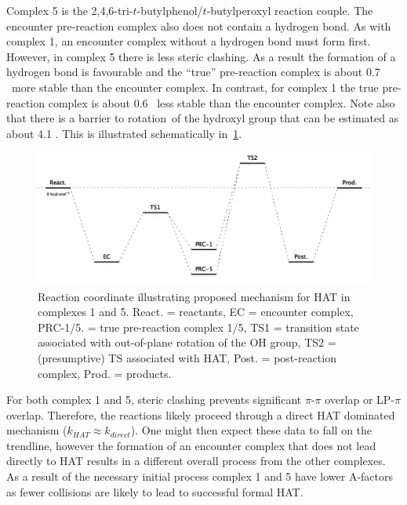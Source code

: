 \begin{doublespace}
Complex 5 is the 2,4,6-tri-$t$-butylphenol/$t$-butylperoxyl reaction couple. The
encounter pre-reaction complex also does not contain a hydrogen bond. As with
complex 1, an encounter complex without a hydrogen bond must form
first. However, in complex 5 there is less steric clashing. As a result the
formation of a hydrogen bond is favourable and the ``true'' pre-reaction complex
is about 0.7 \kcalmol\ more stable than the encounter complex. In contrast, for
complex 1 the true pre-reaction complex is about 0.6 \kcalmol\ less stable than
the encounter complex. Note also that there is a barrier to
rotation\footnotemark\ of the hydroxyl group that can be estimated as about 4.1
\kcalmol. This is illustrated schematically in~\ref{fig:encounter-pes}.


\begin{figure}[!htbp]
  \centering
  \includegraphics[width=\textwidth]{figures/encounter-pes.png}
  \caption[Reaction coordinate illustrating proposed mechanism for HAT in
  complexes 1 and 5.]{Reaction coordinate illustrating proposed mechanism for
  HAT in complexes 1 and 5. React. = reactants, EC = encounter complex,
  PRC-1/5. = true pre-reaction complex 1/5, TS1 = transition state associated
  with out-of-plane rotation of the OH group, TS2 = (presumptive) TS associated
  with HAT, Post. = post-reaction complex, Prod. = products.}
  \label{fig:encounter-pes}
\end{figure}

For both complex 1 and 5, steric clashing prevents significant $\pi$-$\pi$
overlap or LP-$\pi$ overlap. Therefore, the reactions likely proceed through a
direct HAT dominated mechanism ($k_{HAT} \approx k_{direct}$). One might then
expect these data to fall on the trendline, however the formation of an
encounter complex that does not lead directly to HAT results in a different
overall process from the other complexes. As a result of the necessary initial
process complex 1 and 5 have lower A-factors as fewer collisions are likely to
lead to successful formal HAT.



\end{doublespace}
